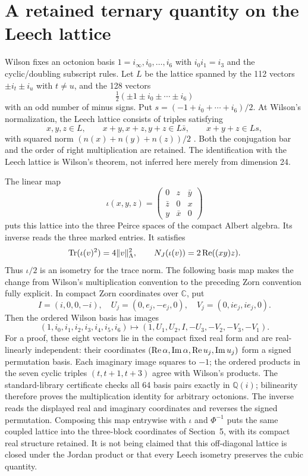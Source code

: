 \documentclass[11pt,reqno]{amsart}
\theoremstyle{definition}\newtheorem{definition}[theorem]{Definition}
\theoremstyle{remark}\newtheorem{remark}[theorem]{Remark}
\newcommand{\Q}{\mathbb Q}\newcommand{\R}{\mathbb R}\newcommand{\C}{\mathbb C}\newcommand{\Z}{\mathbb Z}\newcommand{\OO}{\mathbb O}
\begin{document}
\section{A retained ternary quantity on the Leech lattice}

Wilson fixes an octonion basis $1=i_\infty,i_0,\ldots,i_6$ with
$i_0i_1=i_3$ and the cyclic/doubling subscript rules. Let $L$ be the lattice
spanned by the 112 vectors $\pm i_t\pm i_u$ with $t\ne u$, and the 128 vectors
\[
 \tfrac12(\pm1\pm i_0\pm\cdots\pm i_6)
\]
with an odd number of minus signs. Put $s=(-1+i_0+\cdots+i_6)/2$.
At Wilson's normalization, the Leech lattice consists of triples satisfying
\begin{equation}\label{eq:wilson}
 x,y,z\in L,\qquad x+y,x+z,y+z\in L\bar s,
 \qquad x+y+z\in Ls,
\end{equation}
with squared norm $(n(x)+n(y)+n(z))/2$ \cite[\S3, p.~3]{Wilson}.
Both the conjugation bar and the order of right multiplication are retained.
The identification with the Leech lattice is Wilson's theorem, not inferred
here merely from dimension 24.

The linear map
\[
 \iota(x,y,z)=\begin{pmatrix}0&z&\bar y\\\bar z&0&x\\y&\bar x&0\end{pmatrix}
\]
puts this lattice into the three Peirce spaces of the compact Albert algebra.
Its inverse reads the three marked entries. It satisfies
\begin{equation}\label{eq:leechinvariants}
 \operatorname{Tr}(\iota(v)^2)=4\|v\|_\Lambda^2,
 \qquad N_J(\iota(v))=2\operatorname{Re}((xy)z).
\end{equation}
Thus $\iota/2$ is an isometry for the trace norm. The following basis map
makes the change from Wilson's multiplication convention to the preceding Zorn
convention fully explicit. In compact Zorn coordinates over $\C$, put
\[
 I=(i,0,0,-i),\quad U_j=(0,e_j,-e_j,0),\quad
 V_j=(0,ie_j,ie_j,0).
\]
Then the ordered Wilson basis has images
\begin{equation}\label{eq:wilsonzorn}
 (1,i_0,i_1,i_2,i_3,i_4,i_5,i_6)
 \longmapsto(1,U_1,U_2,I,-U_3,-V_2,-V_3,-V_1).
\end{equation}
For a proof, these eight vectors lie in the compact fixed real form and are
real-linearly independent: their coordinates
$(\operatorname{Re}\alpha,\operatorname{Im}\alpha,\operatorname{Re} u_j,\operatorname{Im}u_j)$ form a signed permutation basis.
Each imaginary image squares to $-1$; the ordered products in the seven
cyclic triples $(t,t+1,t+3)$ agree with Wilson's products. The standard-library
certificate checks all 64 basis pairs exactly in $\Q(i)$; bilinearity therefore
proves the multiplication identity for arbitrary octonions. The inverse reads
the displayed real and imaginary coordinates and reverses the signed permutation.
Composing this map entrywise with $\iota$ and $\Phi^{-1}$ puts the same coupled
lattice into the three-block coordinates of Section~5, with its compact real
structure retained. It is not being claimed
that this off-diagonal lattice is closed under the Jordan product or that every
Leech isometry preserves the cubic quantity.
\end{document}
